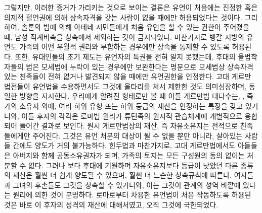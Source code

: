 그렇지만,
이러한 증거가 가리키는 것으로 보이는 결론은
유언이 처음에는
진정한 혹은 의제적 혈연권에 의해
상속자격을 갖는 사람이 없을 때에만 허용되었다는 것이다.
그리하여,
솔론의 법에 의해
아테네 시민들에게 처음
유언을 할 수 있는 권한이 주어졌을 때,
남성 직계비속을 상속에서 제외하는 것이 금지되었다.
마찬가지로 벵갈 지방의 유언도
가족의 어떤 우월적 권리와 부합하는 경우에만
상속을 통제할 수 있도록 허용된다.
또한, 유대인들의 초기 제도는 유언자의 특권을 전혀 알지 못했는데,
후대의 율법학자들의 법은
모세법에 누락이 있는 경우에만 보완한다는 명분으로
모세법상 상속자격 있는 친족들이 전혀 없거나 발견되지 않을 때에만
유언권한을 인정한다.
고대 게르만 법전들이 유언법을 수용하면서도 그것에 울타리를 쳐서 제한한 것도
의미심장하며, 동일한 방향을 지시한다.
우리에게 알려진 형태로만 볼 때 이들 게르만법 대다수는,
, 즉 가의 소유지 외에,
여러 하위 유형 또는 하위 등급의 재산을 인정하는
특징을 갖고 있거니와,
이들 후자의 각각은 로마법 원리가 튜턴족의 원시적 관습체계에
개별적으로 융합되어 들어간 결과로 보인다.
원시 게르만법상의 재산, 즉 자유소유지는 전적으로 친족들에게만 주어진다.
그것은 유언 처분의 대상이 될 수 없을 뿐만 아니라,
살아있는 사람들 간에도 양도가 거의 불가능하다.
힌두법과 마찬가지로, 고대 게르만법에서도
아들들은 아버지와 함께 공동소유권자가 되며,
가족의 토지는 모든 구성원의 동의 없이는 처분할 수 없다.
그러나 보다 후대에 기원하며 자유소유지보다 등급이 낮았던
다른 종류의 재산은 훨씬 더 쉽게 양도될 수 있으며,
훨씬 더 느슨한 상속규칙에 따른다.
여자들과 그녀의 후손들도 그것을 상속할 수 있거니와, 이는
그것이 관계의 성역 바깥에 있다는
원리에 의한 것이 분명하다.
로마로부터 차용한 유언법이 처음 작동하도록 허용된 것은
바로 이 후자의 성격의 재산에 대해서였고, 오직 그것에 국한되었다.

